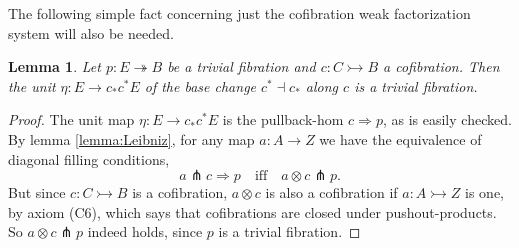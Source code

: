 \documentclass[11pt]{amsart}
\newcommand{\mono}{\ensuremath{\rightarrowtail}}
\newcommand{\ra}{\ensuremath{\rightarrow}}
\renewcommand{\to}{\ensuremath{\rightarrow}}
\newcommand{\onto}{\ensuremath{\twoheadrightarrow}}
\newtheorem{lemma}[theorem]{Lemma}
\theoremstyle{remark}
\theoremstyle{definition}
\begin{document}
The following simple fact concerning just the cofibration weak factorization system will also be needed.

\begin{lemma}\label{lemma:etaTF}
Let $p: E \onto B$ be a trivial fibration and $c : C\mono B$ a cofibration.  Then the unit $\eta:E \ra c_*c^*E$ of the base change $c^*\dashv c_*$ along $c$ is a trivial fibration.
\end{lemma}

\begin{proof}
The unit map $\eta:E \ra c_*c^*E$ is the pullback-hom $c\!\Rightarrow\! p$, as is easily checked.
By lemma \ref{lemma:Leibniz}, for any map $a : A \to Z$ we have the equivalence of diagonal filling conditions,
\[
a \pitchfork c\!\Rightarrow\!p  \quad\text{iff}\quad a\!\otimes\!c \pitchfork p.
\]
But since $c : C\mono B$ is a cofibration, $a\otimes c$ is also a cofibration if $a : A \mono Z$ is one, by axiom (C6), which says that cofibrations are closed under pushout-products.  So $a\otimes c \pitchfork p$ indeed holds, since $p$ is a trivial fibration.
\end{proof}
\end{document}
